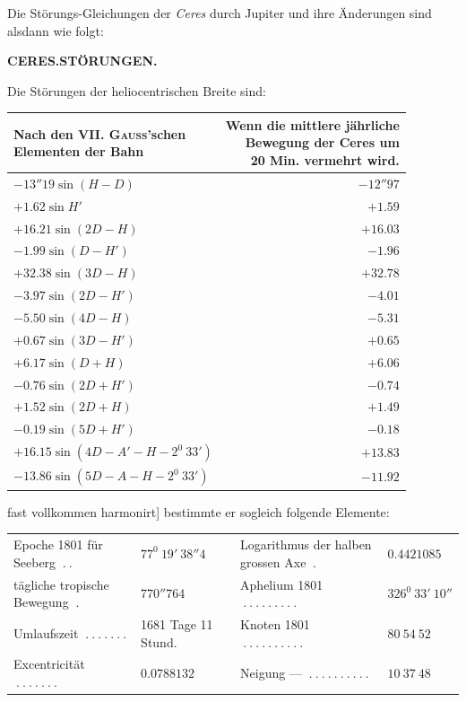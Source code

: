 Die Störungs-Gleichungen der \textit{Ceres} durch Jupiter und ihre Änderungen sind alsdann wie folgt:
\par\clearpage
\thispagestyle{empty}
\noindent{}%
%
\parbox[t]{\dimexpr\linewidth-24mm\relax}{\centering\footnotesize\bfseries CERES.\enspace STÖRUNGEN.\par}%
\makebox[12mm][r]{}\par\nobreak\medskip
\indent Die Störungen der heliocentrischen Breite sind:
\begin{center}
\begingroup\small
\begin{tabular}{l|r}
\shortstack{Nach den VII. \textsc{Gauss}'schen\\Elementen der Bahn}&\shortstack{Wenn die mittlere jährliche\\Bewegung der Ceres um\\20 Min. vermehrt wird.}\\\hline
$-13''19\sin(H-D)$&$-12''97$\\
$+1.62\sin H'$&$+1.59$\\[3pt]
$+16.21\sin(2D-H)$&$+16.03$\\
$-1.99\sin(D-H')$&$-1.96$\\[3pt]
$+32.38\sin(3D-H)$&$+32.78$\\
$-3.97\sin(2D-H')$&$-4.01$\\[3pt]
$-5.50\sin(4D-H)$&$-5.31$\\
$+0.67\sin(3D-H')$&$+0.65$\\[3pt]
$+6.17\sin(D+H)$&$+6.06$\\
$-0.76\sin(2D+H')$&$-0.74$\\[3pt]
$+1.52\sin(2D+H)$&$+1.49$\\
$-0.19\sin(5D+H')$&$-0.18$\\[3pt]
$+16.15\sin(4D-A'-H-2^0\ 33')$&$+13.83$\\
$-13.86\sin(5D-A-H-2^0\ 33')$&$-11.92$
\end{tabular}\endgroup
\end{center}
fast vollkommen harmonirt] bestimmte er sogleich folgende Elemente:
\begin{center}
\begingroup\fontsize{8}{10}\selectfont\setlength{\tabcolsep}{2pt}
\begin{tabular}{@{}p{.305\linewidth}l|p{.315\linewidth}l@{}}
Epoche 1801 für Seeberg $\ .\ .$&$77^0\ 19'\ 38''4$&Logarithmus der halben grossen Axe $\ .$&$0.4421085$\\
tägliche tropische Bewegung $\ .$&$770''764$&Aphelium 1801 $\ .\ .\ .\ .\ .\ .\ .\ .\ .$&$326^0\ 33'\ 10''$\\
Umlaufszeit $\ .\ .\ .\ .\ .\ .\ .$&1681 Tage 11 Stund.&Knoten 1801 $\ .\ .\ .\ .\ .\ .\ .\ .\ .\ .$&$80\ 54\ 52$\\
Excentricität $\ .\ .\ .\ .\ .\ .\ .$&$0.0788132$&Neigung — $\ .\ .\ .\ .\ .\ .\ .\ .\ .\ .$&$10\ 37\ 48$
\end{tabular}\endgroup
\end{center}

